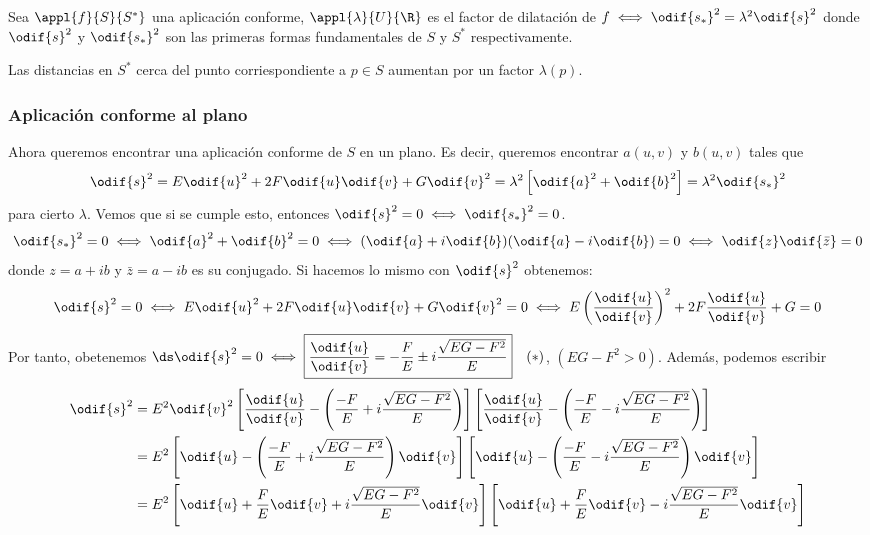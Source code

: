 \begin{defn}
	Sea $\appl{f}{S}{S^*}$ una aplicación conforme, $\appl{\lambda}{U}{\R}$ es el factor de dilatación de $f \iff \odif{s_*}^2 = \lambda^2 \odif{s}^2$ donde $\odif{s}^2$ y $\odif{s_*}^2$ son las primeras formas fundamentales de $S$ y $S^*$ respectivamente.

	Las distancias en $S^*$ cerca del punto corriespondiente a $p \in S$ aumentan por un factor $\lambda(p)$.
\end{defn}

\subsubsection{Aplicación conforme al plano}

Ahora queremos encontrar una aplicación conforme de $S$ en un plano. Es decir, queremos encontrar $a(u, v)$ y $b(u, v)$ tales que
\[\odif{s}^2 = E\odif{u}^2 + 2F\odif{u}\odif{v} + G\odif{v}^2 = \lambda^2 \left[\odif{a}^2 + \odif{b}^2\right] = \lambda^2 \odif{s_*}^2\]
para cierto $\lambda$. Vemos que si se cumple esto, entonces $\odif{s}^2=0 \iff \odif{s_*}^2 = 0$.
\[\odif{s_*}^2 = 0 \iff \odif{a}^2 + \odif{b}^2 = 0 \iff (\odif{a} + i \odif{b})(\odif{a} - i \odif{b}) = 0\iff \odif{z}\odif{\bar{z}} = 0\]
donde $z = a + ib$ y $\bar{z}=a-ib$ es su conjugado. Si hacemos lo mismo con $\odif{s}^2$ obtenemos:
\[\odif{s}^2 = 0 \iff E\odif{u}^2 + 2F\odif{u}\odif{v} + G\odif{v}^2 = 0 \iff E\left(\frac{\odif{u}}{\odif{v}}\right)^2 + 2F\frac{\odif{u}}{\odif{v}} + G = 0\]
Por tanto, obetenemos $\ds \odif{s}^2= 0 \iff \boxed{\frac{\odif{u}}{\odif{v}} = -\frac{F}{E} \pm i \frac{\sqrt{EG - F^2}}{E}} \quad (*)$, $(EG-F^2> 0)$. Además, podemos escribir
\[\begin{aligned}
		\odif{s}^2 & = E^2 \odif{v}^2 \left[\frac{\odif{u}}{\odif{v}} - \left(\frac{-F}{E} + i \frac{\sqrt{EG-F^2}}{E}\right)\right]\left[\frac{\odif{u}}{\odif{v}} - \left(\frac{-F}{E} - i \frac{\sqrt{EG-F^2}}{E}\right)\right] \\
		           & = E^2 \left[\odif{u} - \left(\frac{-F}{E} + i \frac{\sqrt{EG-F^2}}{E}\right)\odif{v}\right]\left[\odif{u} - \left(\frac{-F}{E} - i \frac{\sqrt{EG-F^2}}{E}\right)\odif{v}\right]                              \\
		           & = E^2 \left[\odif{u} + \frac{F}{E} \odif{v} + i \frac{\sqrt{EG-F^2}}{E}\odif{v}\right]\left[\odif{u} + \frac{F}{E} \odif{v} - i \frac{\sqrt{EG-F^2}}{E}\odif{v}\right]
	\end{aligned}\]

